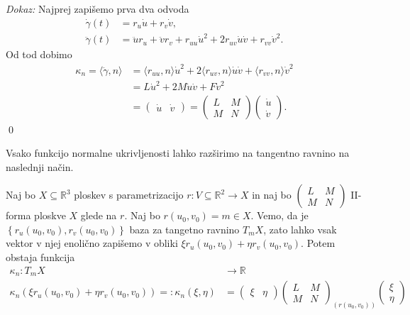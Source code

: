 \noindent
{\em Dokaz:\/}
 Najprej zapišemo prva dva odvoda 
 \begin{align*}
     \dot{\gamma}(t) &= r_u \dot{u} + r_v \dot{v}, \\
     \ddot{\gamma}(t) &= \ddot{u} r_u + \ddot{v} r_v + r_{uu} \dot{u}^2 + 2r_{uv} \dot{u} \dot{v} + r_{vv} \dot{v}^2   .
 \end{align*}
Od tod dobimo 
\begin{align*}
    \kappa_n = \langle \ddot{\gamma}, n \rangle  &= \langle r_{uu}, n \rangle \dot{u}^2 + 2  \langle r_{uv}, n \rangle \dot{u} \dot{v} + \langle r_{vv}, n \rangle  \dot{v}^2 \\
     &= L \dot{u}^2 + 2M \dot{u} \dot{v} + F \dot{v}^2 \\
     &= \begin{pmatrix}
        \dot{u} & \dot{v} 
      \end{pmatrix} = 
      \begin{pmatrix}
        L & M \\
        M & N
      \end{pmatrix}  
      \begin{pmatrix}
        \dot{u} \\
        \dot{v} 
      \end{pmatrix}.
\end{align*}
\qed

Vsako funkcijo normalne ukrivljenosti lahko razširimo na tangentno ravnino na naslednji način.

\begin{definicija}
\label{def_razsiritev_normalne_ukrivljenosti}
    Naj bo $X \subseteq \mathbb{R}^3$ ploskev s parametrizacijo $r: V \subseteq \mathbb{R}^2 \to  X$
    in naj bo $\begin{pmatrix}
    L & M \\
    M & N
    \end{pmatrix}$ II-forma ploskve $X$ glede na $r$. Naj bo $r(u_0, v_0) = m \in  X$. Vemo, da je $\left\{ r_u(u_0, v_0), r_v(u_0, v_0) \right\}$ baza za
    tangetno ravnino $T_mX$, zato lahko vsak vektor v njej enolično zapišemo v obliki $\xi r_u(u_0, v_0) + \eta r_v(u_0, v_0).$
    Potem obstaja funkcija \begin{align*}
       \kappa_n : T_mX &\longrightarrow \mathbb{R} \\
        \kappa_n(\xi r_u(u_0, v_0) + \eta r_v(u_0, v_0)) =: \kappa_n(\xi, \eta) &=
        \begin{pmatrix}
          \xi  & \eta
        \end{pmatrix}
        \begin{pmatrix}
          L & M \\
          M & N
        \end{pmatrix}_{(r(u_0, v_0))}  
        \begin{pmatrix}
          \xi \\
          \eta
        \end{pmatrix}
    \end{align*} 
\end{definicija}

